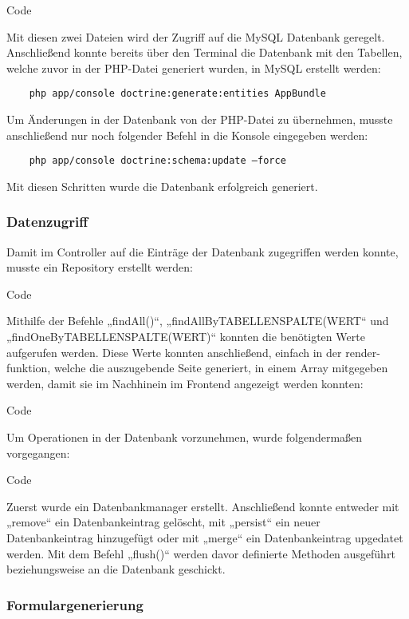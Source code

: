 	Code
	
	Mit diesen zwei Dateien wird der Zugriff auf die MySQL Datenbank geregelt.
	Anschließend konnte bereits über den Terminal die Datenbank mit den Tabellen, welche zuvor in der PHP-Datei generiert wurden, in MySQL erstellt werden:
	\lstset{language = bash}
  	\begin{lstlisting}
	php app/console doctrine:generate:entities AppBundle
  	\end{lstlisting}
	Um Änderungen in der Datenbank von der PHP-Datei zu übernehmen, musste anschließend nur noch folgender Befehl in die Konsole eingegeben werden:
	\lstset{language = bash}
  	\begin{lstlisting}
	php app/console doctrine:schema:update —force
  	\end{lstlisting}
	Mit diesen Schritten wurde die Datenbank erfolgreich generiert.

    \subsubsection{Datenzugriff}

	Damit im Controller auf die Einträge der Datenbank zugegriffen werden konnte, musste ein Repository erstellt werden:
	
	Code
	
	Mithilfe der Befehle „findAll()“, „findAllByTABELLENSPALTE(WERT“ und „findOneByTABELLENSPALTE(WERT)“ konnten die benötigten Werte aufgerufen werden.
	Diese Werte konnten anschließend, einfach in der render-funktion, welche die auszugebende Seite generiert, in einem Array mitgegeben werden, damit sie im Nachhinein im Frontend angezeigt werden konnten:
	
	Code
	
	Um Operationen in der Datenbank vorzunehmen, wurde folgendermaßen vorgegangen:
	
	Code
	
	Zuerst wurde ein Datenbankmanager erstellt. Anschließend konnte entweder mit „remove“ ein Datenbankeintrag gelöscht, mit „persist“ ein neuer Datenbankeintrag hinzugefügt oder mit „merge“ ein Datenbankeintrag upgedatet werden. Mit dem Befehl „flush()“ werden davor definierte Methoden ausgeführt beziehungsweise an die Datenbank geschickt.

    \subsubsection{Formulargenerierung}

